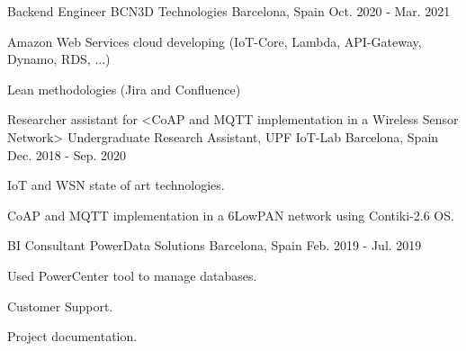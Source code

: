 


\begin{cventries}


\cventry
{Backend Engineer} %
{BCN3D Technologies} %
{Barcelona, Spain} %
{Oct. 2020 - Mar. 2021} %
{ %
\begin{cvitems}
\item {Amazon Web Services cloud developing (IoT-Core, Lambda, API-Gateway, Dynamo, RDS, ...)}
\item {Lean methodologies (Jira and Confluence)}
\end{cvitems} 
}

\cventry
{Researcher assistant for <CoAP and MQTT implementation in a Wireless Sensor Network>} %
{Undergraduate Research Assistant, UPF IoT-Lab} %
{Barcelona, Spain} %
{Dec. 2018 - Sep. 2020} %
{ %
\begin{cvitems}
\item {IoT and WSN state of art technologies.}
\item {CoAP and MQTT implementation in a 6LowPAN network using Contiki-2.6 OS.}
\end{cvitems} 
}


\cventry
{BI Consultant} %
{PowerData Solutions} %
{Barcelona, Spain} %
{Feb. 2019 - Jul. 2019} %
{ %
\begin{cvitems}
\item {Used PowerCenter tool to manage databases.}
\item {Customer Support.}
\item {Project documentation.}
\end{cvitems}
}


\end{cventries}
